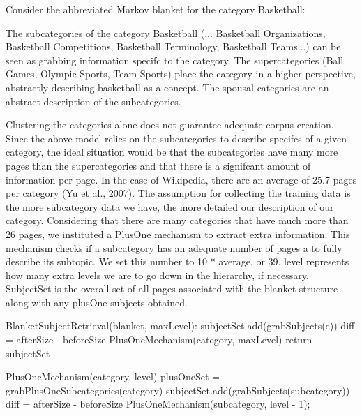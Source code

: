\documentclass{www2010-submission}
\begin{document}
Consider the abbreviated Markov blanket for the category Basketball:

The subcategories of the category Basketball (... Basketball Organizations, Basketball Competitions, Basketball Terminology, Basketball Teams...) can be seen as grabbing information specifc to the category. The supercategories (Ball Games, Olympic Sports, Team Sports) place the category in a higher perspective, abstractly describing basketball as a concept. The spousal categories are an abstract description of the subcategories.

Clustering the categories alone does not guarantee adequate corpus creation. Since the above model relies on the subcategories to describe specifcs of a given category, the ideal situation would be that the subcategories have many more pages than the supercategories and that there is a signifcant amount of information per page. In the case of Wikipedia, there are an average of 25.7 pages per category (Yu et al., 2007). The assumption for collecting the training data is the more subcategory data we have, the more detailed our description of our category. Considering that there are many categories that have much more than 26 pages, we instituted a PlusOne mechanism to extract extra information. This mechanism checks if a subcategory has an adequate number of pages a to fully describe its subtopic. We set this number to 10 * average, or 39. level represents how many extra levels we are to go down in the hierarchy, if necessary. SubjectSet is the overall set of all pages associated with the blanket structure along with any plusOne subjects obtained.


\begin{algorithmic}
\label{alg1}
\STATE BlanketSubjectRetrieval(blanket, maxLevel):
	\STATE subjectSet.add(grabSubjects(c))
	\STATE diff = afterSize - beforeSize
		\STATE PlusOneMechanism(category, maxLevel)
	\ENDIF
\ENDFOR
\STATE return subjectSet
\end{algorithmic}



\label{alg2}
	\begin{algorithmic}
		\STATE PlusOneMechanism(category, level)
		\STATE plusOneSet = grabPlusOneSubcategories(category)
			\STATE subjectSet.add(grabSubjects(subcategory))
			\STATE diff = afterSize - beforeSize
				\STATE PlusOneMechanism(subcategory, level - 1);
			\ENDIF
		\ENDFOR
	\end{algorithmic}
\end{document}
